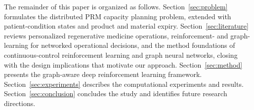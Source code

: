 \documentclass[preprint,review,12pt,nonatbib]{elsarticle}
\providecommand{\DIFadd}[1]{{\protect\color{blue}#1}} %
\providecommand{\DIFdel}[1]{} %
\providecommand{\DIFaddbegin}{} %
\providecommand{\DIFaddend}{} %
\providecommand{\DIFdelbegin}{} %
\providecommand{\DIFdelend}{} %
\providecommand{\DIFscaledelfig}{0.5}
\newlength{\DIFdelgraphicswidth} %
\newlength{\DIFdelgraphicsheight} %
\providecommand{\DIFaddincludegraphics}[2][]{{\color{blue}\fbox{\DIFOincludegraphics[#1]{#2}}}} %
\providecommand{\DIFdelincludegraphics}[2][]{%
\sbox{\DIFdelgraphicsbox}{\DIFOincludegraphics[#1]{#2}}%
\settoboxwidth{\DIFdelgraphicswidth}{\DIFdelgraphicsbox} %
\settoboxtotalheight{\DIFdelgraphicsheight}{\DIFdelgraphicsbox} %
\scalebox{\DIFscaledelfig}{%
\parbox[b]{\DIFdelgraphicswidth}{\usebox{\DIFdelgraphicsbox}\\[-\baselineskip] \rule{\DIFdelgraphicswidth}{0em}}\llap{\resizebox{\DIFdelgraphicswidth}{\DIFdelgraphicsheight}{%
\setlength{\unitlength}{\DIFdelgraphicswidth}%
\begin{picture}(1,1)%
\thicklines\linethickness{2pt} %
{\color[rgb]{1,0,0}\put(0,0){\framebox(1,1){}}}%
{\color[rgb]{1,0,0}\put(0,0){\line( 1,1){1}}}%
{\color[rgb]{1,0,0}\put(0,1){\line(1,-1){1}}}%
\end{picture}%
}\hspace*{3pt}}} %
} %
\DeclareRobustCommand{\DIFaddbegin}{\DIFOaddbegin \let\includegraphics\DIFaddincludegraphics} %
\DeclareRobustCommand{\DIFaddend}{\DIFOaddend \let\includegraphics\DIFOincludegraphics} %
\DeclareRobustCommand{\DIFdelbegin}{\DIFOdelbegin \let\includegraphics\DIFdelincludegraphics} %
\DeclareRobustCommand{\DIFdelend}{\DIFOaddend \let\includegraphics\DIFOincludegraphics} %
\begin{document}
The remainder of this paper is organized as follows. Section~\ref{sec:problem} \DIFdelbegin \DIFdel{describes }\DIFdelend \DIFaddbegin \DIFadd{formulates }\DIFaddend the distributed PRM capacity planning problem\DIFaddbegin \DIFadd{, extended with patient-condition states and product and material expiry}\DIFaddend . Section~\ref{sec:literature} reviews \DIFdelbegin \DIFdel{related work}\DIFdelend \DIFaddbegin \DIFadd{personalized regenerative medicine operations, reinforcement- and graph-learning for networked operational decisions, and the method foundations of continuous-control reinforcement learning and graph neural networks, closing with the design implications that motivate our approach}\DIFaddend . Section~\ref{sec:method} presents the \DIFdelbegin \DIFdel{proposed }\DIFdelend graph-aware deep reinforcement learning framework. Section~\ref{sec:experiments} describes the computational experiments and results. Section~\ref{sec:conclusion} concludes the study and identifies future research directions.
\end{document}

